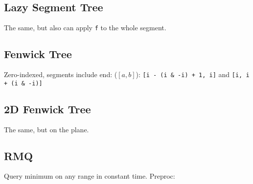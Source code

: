 \subsection{Lazy Segment Tree}

The same, but also can apply \verb|f| to the whole segment.

\subsection{Fenwick Tree}

Zero-indexed, segments include end: ($[a, b]$): \verb|[i - (i & -i) + 1, i]| and \verb|[i, i + (i & -i)]|

\subsection{2D Fenwick Tree}

The same, but on the plane.

\subsection{RMQ}

Query minimum on any range in constant time. Preproc: 

